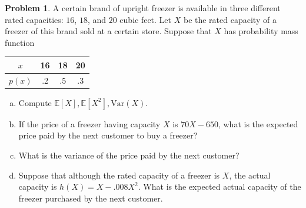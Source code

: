 \documentclass[10pt]{article}
\theoremstyle{definition}
\newtheorem{problem}[theorem]{Problem}
\newcommand{\1}[1]{\textbf{1}_{\left[#1\right]}} %
\def\E{\mathbb{E}} %
\def\Var{\mathrm{Var}} %
\begin{document}
\begin{problem}
  A certain brand of upright freezer is available in three different rated
  capacities: $16$,  $18$, and $20$ cubic feet. Let $X$ be the rated capacity
  of a freezer of this brand sold at a certain store. Suppose that $X$ has
  probability mass function
  \begin{center}
    \begin{tabular}[c]{c|ccc}
      $x$&16&18&20\\ 
      \hline
      $p(x)$&.2&.5&.3 
    \end{tabular}
  \end{center}
  \begin{enumerate}[(a)]
    \item Compute $\E\left[X \right], \E\left[X^{2} \right], \Var(X)$.
    \item If the price of a freezer having capacity $X$ is $70X-650$, what is
    the expected price paid by the next customer to buy a freezer?
    \item What is the variance of the price paid by the next customer?
    \item Suppose that although the rated capacity of a freezer is $X$, the
    actual capacity is $h(X)=X-.008X^{2}$. What is the expected actual
    capacity of the freezer purchased by the next customer.
  \end{enumerate}
\end{problem}

\newpage
\end{document}
